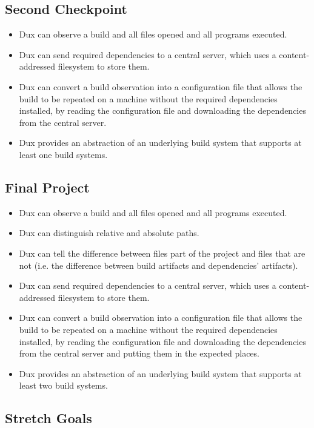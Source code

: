 \documentclass[10pt,conference]{IEEEtran}
\begin{document}
\subsection{Second Checkpoint}

\begin{itemize}
\item{Dux can observe a build and all files opened and all programs executed.}
\item{Dux can send required dependencies to a central server, which uses a content-addressed filesystem to store them.}
\item{Dux can convert a build observation into a configuration file that allows the build to be
repeated on a machine without the required dependencies installed,
by reading the configuration file and downloading the dependencies from the
central server.}
\item{Dux provides an abstraction of an underlying build system that supports at least one build systems.}
\end{itemize}

\subsection{Final Project}

\begin{itemize}
\item{Dux can observe a build and all files opened and all programs executed.}
\item{Dux can distinguish relative and absolute paths.}
\item{Dux can tell the difference between files part of the project and files that are not
(i.e. the difference between build artifacts and dependencies’ artifacts).}
\item{Dux can send required dependencies to a central server, which uses a content-addressed filesystem to store them.}
\item{Dux can convert a build observation into a configuration file that allows the build to be
repeated on a machine without the required dependencies installed,
by reading the configuration file and downloading the dependencies from the
central server and putting them in the expected places.}
\item{Dux provides an abstraction of an underlying build system that supports at least two build systems.}
\end{itemize}

\subsection{Stretch Goals}
\end{document}

